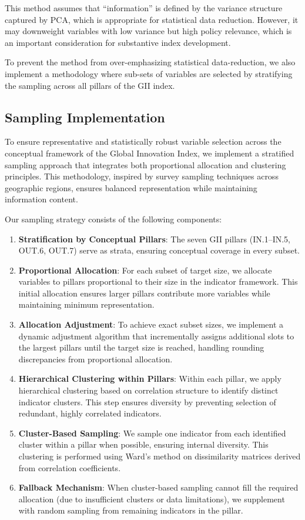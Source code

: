 \documentclass[
  letterpaper,
  DIV=11,
  numbers=noendperiod]{scrartcl}
\begin{document}
This method assumes that ``information'' is defined by the variance
structure captured by PCA, which is appropriate for statistical data
reduction. However, it may downweight variables with low variance but
high policy relevance, which is an important consideration for
substantive index development.

To prevent the method from over-emphasizing statistical data-reduction,
we also implement a methodology where sub-sets of variables are selected
by stratifying the sampling across all pillars of the GII index.

\subsection{Sampling Implementation}\label{sampling-implementation}

To ensure representative and statistically robust variable selection
across the conceptual framework of the Global Innovation Index, we
implement a stratified sampling approach that integrates both
proportional allocation and clustering principles. This methodology,
inspired by survey sampling techniques across geographic regions,
ensures balanced representation while maintaining information content.

Our sampling strategy consists of the following components:

\begin{enumerate}
\def\labelenumi{\arabic{enumi}.}
\item
  \textbf{Stratification by Conceptual Pillars}: The seven GII pillars
  (IN.1--IN.5, OUT.6, OUT.7) serve as strata, ensuring conceptual
  coverage in every subset.
\item
  \textbf{Proportional Allocation}: For each subset of target size, we
  allocate variables to pillars proportional to their size in the
  indicator framework. This initial allocation ensures larger pillars
  contribute more variables while maintaining minimum representation.
\item
  \textbf{Allocation Adjustment}: To achieve exact subset sizes, we
  implement a dynamic adjustment algorithm that incrementally assigns
  additional slots to the largest pillars until the target size is
  reached, handling rounding discrepancies from proportional allocation.
\item
  \textbf{Hierarchical Clustering within Pillars}: Within each pillar,
  we apply hierarchical clustering based on correlation structure to
  identify distinct indicator clusters. This step ensures diversity by
  preventing selection of redundant, highly correlated indicators.
\item
  \textbf{Cluster-Based Sampling}: We sample one indicator from each
  identified cluster within a pillar when possible, ensuring internal
  diversity. This clustering is performed using Ward's method on
  dissimilarity matrices derived from correlation coefficients.
\item
  \textbf{Fallback Mechanism}: When cluster-based sampling cannot fill
  the required allocation (due to insufficient clusters or data
  limitations), we supplement with random sampling from remaining
  indicators in the pillar.
\end{enumerate}
\end{document}
